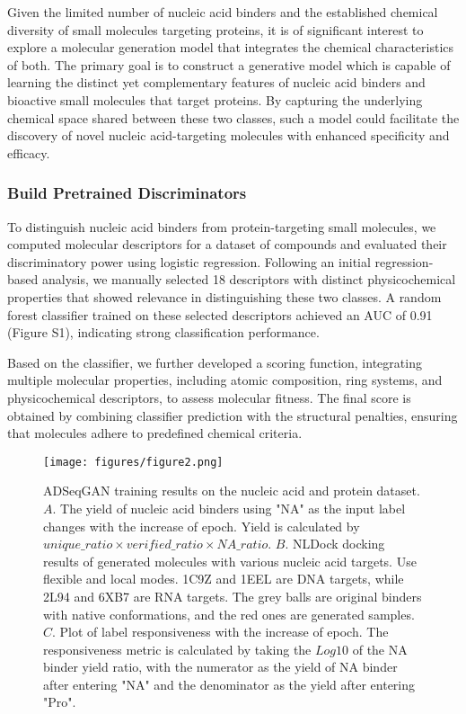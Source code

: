 \documentclass[10pt, twocolumn]{article}
\begin{document}
Given the limited number of nucleic acid binders and the established chemical diversity of small molecules targeting proteins, it is of significant interest to explore a molecular generation model that integrates the chemical characteristics of both. The primary goal is to construct a generative model which is capable of learning the distinct yet complementary features of nucleic acid binders and bioactive small molecules that target proteins. By capturing the underlying chemical space shared between these two classes, such a model could facilitate the discovery of novel nucleic acid-targeting molecules with enhanced specificity and efficacy.

\subsubsection*{Build Pretrained Discriminators}

To distinguish nucleic acid binders from protein-targeting small molecules, we computed molecular descriptors for a dataset of compounds and evaluated their discriminatory power using logistic regression. Following an initial regression-based analysis, we manually selected 18 descriptors with distinct physicochemical properties that showed relevance in distinguishing these two classes. A random forest classifier trained on these selected descriptors achieved an AUC of 0.91 (Figure S1), indicating strong classification performance.

Based on the classifier, we further developed a scoring function, integrating multiple molecular properties, including atomic composition, ring systems, and physicochemical descriptors, to assess molecular fitness. The final score is obtained by combining classifier prediction with the structural penalties, ensuring that molecules adhere to predefined chemical criteria.


\begin{figure*}[!htb]
    \centering
    \texttt{[image: figures/figure2.png]}
    \caption{\small ADSeqGAN training results on the nucleic acid and protein dataset. $A.$ The yield of nucleic acid binders using "NA" as the input label changes with the increase of epoch. Yield is calculated by $unique\_ratio\times verified\_ratio \times NA\_ratio$. $B.$ NLDock docking results of generated molecules with various nucleic acid targets. Use flexible and local modes. 1C9Z and 1EEL are DNA targets, while 2L94 and 6XB7 are RNA targets. The grey balls are original binders with native conformations, and the red ones are generated samples. $C.$ Plot of label responsiveness with the increase of epoch. The responsiveness metric is calculated by taking the $Log10$ of the NA binder yield ratio, with the numerator as the yield of NA binder after entering "NA" and the denominator as the yield after entering "Pro". }
    \label{fig:fig2}
\end{figure*}
\end{document}
